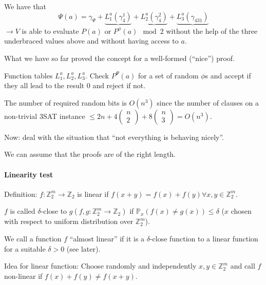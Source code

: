 \documentclass[11pt]{article}
\theoremstyle{definition}
\theoremstyle{definition}
\begin{document}
\begin{enumerate}
	We have that
	\[ \Psi(a) = \gamma_{\Psi} + \underbrace{L_1^a (\gamma_4^1)} + \underbrace{L_2^a (\gamma_4^2)} + \underbrace{L_3^a (\gamma_431)} \]
	$ \rightarrow V $ is able to evaluate $ P(a) $ or $ P^{\phi}(a) \mod 2 $ without the help of the three underbraced values above and without having access to $ a $.
	
	What we have so far proved the concept for a well-formed (``nice'') proof.
	
	Function tables $ L_1^a, L_2^a, L_3^a $.
	Check $ P^{\Psi}(a) $ for a set of random $ \phi$s and accept if they all lead to the result 0 and reject if not.
	
	The number of required random bits is $ O(n^3) $ since the number of clauses on a non-trivial 3SAT instance $ \leq 2n + 4 \begin{pmatrix}n \\ 2 \end{pmatrix} + 8 \begin{pmatrix}n \\ 3 \end{pmatrix} = O(n^3) $.
\end{enumerate} \bigskip
	
Now: deal with the situation that ``not everything is behaving nicely''.
	
We can assume that the proofs are of the right length.
	

	
\paragraph{Linearity test}
Definition: $ f : \mathbb{Z}_2^m \rightarrow \mathbb{Z}_2 $ is linear if $ f(x + y) = f(x) + f(y) \forall x, y \in \mathbb{Z}_2^m. $

$ f $ is called $ \delta $-close to $ g (f, g: \mathbb{Z}_2^m \rightarrow \mathbb{Z}_2)$ if $ \mathbb{P}_x(f(x) \neq g(x))\leq \delta $ ($ x $ chosen with respect to uniform distribution over  $\mathbb{Z}_2^m$).

We call a function $ f $ ``almost linear'' if it is a $ \delta $-close function to a linear function for a suitable $ \delta > 0 $ (see later).

Idea for linear function: Choose randomly and independently $ x, y \in \mathbb{Z}_2^m $ and call $ f $ non-linear if $ f(x) + f(y) \neq f(x + y) $.
\end{document}
